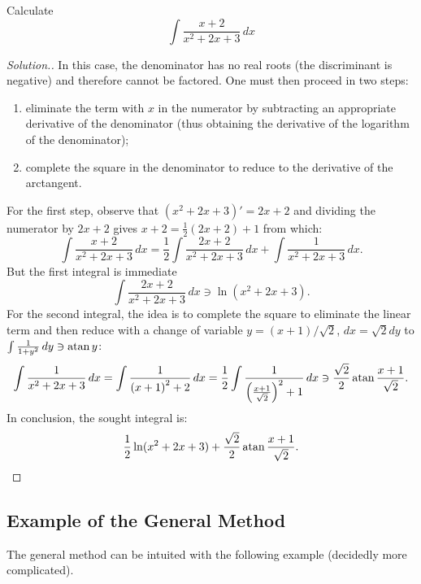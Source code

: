 \begin{example}
Calculate 
\[
 \int \frac{x+2}{x^2+2x+3}\, dx
\]
\end{example}
\begin{proof}[Solution.]
In this case, the denominator has no real roots (the discriminant is negative)
and therefore cannot be factored.
One must then proceed in two steps: 
\begin{enumerate}
  \item eliminate the term with $x$ in the numerator by subtracting 
  an appropriate derivative of the denominator (thus obtaining the derivative 
  of the logarithm of the denominator);
  \item complete the square in the denominator to reduce to the 
  derivative of the arctangent. 
\end{enumerate} 
For the first step, observe that $(x^2+2x+3)' = 2x+2$ and dividing the numerator
by $2x+2$ gives $x+2 = \frac 1 2 (2x+2) + 1$ from which:
\[
\int \frac{x+2}{x^2+2x+3} \, dx
= \frac 1 2 \int \frac{2x + 2}{x^2+2x+3}\, dx + \int \frac{1}{x^2+2x+3}\, dx. 
\]
But the first integral is immediate 
\[
\int \frac{2x+2}{x^2+2x+3}\, dx \ni \ln (x^2+2x+3).
\]
For the second integral, the idea is to complete the 
square to eliminate the linear term and then 
reduce with a change of variable 
$y=(x+1)/\sqrt 2$, $dx = \sqrt 2 dy$ 
to $\int \frac{1}{1+y^2}\, dy\ni \operatorname{atan} y$:
\[
  \int \frac{1}{x^2+2x+3}\, dx 
  = \int \frac{1}{{\left( x+1 \right)}^2 + 2}\, dx 
  = \frac 1 2 \int \frac{1}{{\left( \frac{x+1}{\sqrt 2} \right)}^2+1}\, dx 
  \ni \frac{\sqrt 2}{2} \operatorname{atan} \frac{x+1}{\sqrt 2}.
\]
In conclusion, the sought integral is:
\[
  \frac 1 2 \ln (x^2+2x+3) + \frac{\sqrt 2}{2} \operatorname{atan} \frac{x+1}{\sqrt 2}.
\]
\end{proof}

\subsection{Example of the General Method}

The general method can be intuited with the following 
example (decidedly more complicated).

